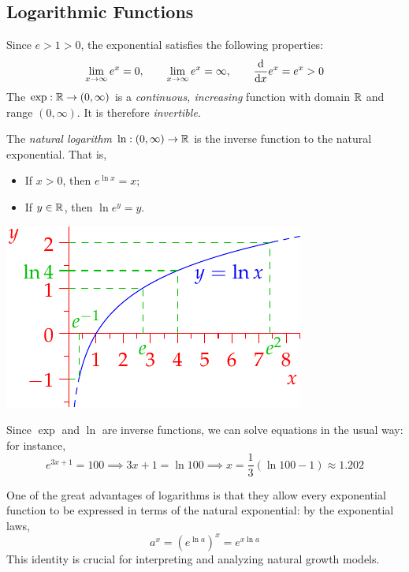\clearpage



\subsection{Logarithmic Functions}

Since $e>1>0$, the exponential satisfies the following properties:
\[\lim_{x\to\infty}e^x=0,\qquad \lim_{x\to\infty}e^x=\infty,\qquad \frac{\mathrm{d} }{\mathrm{d} x}e^x=e^x>0\]
The $\exp:\mathbb{R}\to(0,\infty)$ is a \emph{continuous, increasing} function with domain $\mathbb{R}$ and range $(0,\infty)$. It is therefore \emph{invertible.}


\begin{defn}[lower separated=false, sidebyside, sidebyside align=top seam, sidebyside gap=0pt, righthand width=0.4\linewidth]{}{}
The \emph{natural logarithm} $\ln:(0,\infty)\to\mathbb{R}$ is the inverse function to the natural exponential. That is,
\begin{itemize}
	\item If $x>0$, then $e^{\ln x}=x$;
	\item If $y\in\mathbb{R}$, then $\ln e^y=y$.
\end{itemize}
\tcblower
\flushright\includegraphics{log}
\end{defn}

Since $\exp$ and $\ln$ are inverse functions, we can solve equations in the usual way: for instance,
\[e^{3x+1}=100 \implies 3x+1=\ln 100\implies x=\frac 13(\ln 100-1) \approx 1.202\]



One of the great advantages of logarithms is that they allow every exponential function to be expressed in terms of the natural exponential: by the exponential laws,
\[a^x=(e^{\ln a})^x=e^{x\ln a}\]
This identity is crucial for interpreting and analyzing natural growth models.



